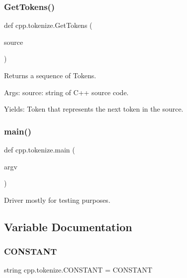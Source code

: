 \subsubsection{\texorpdfstring{Get\+Tokens()}{GetTokens()}}
{\footnotesize\ttfamily def cpp.\+tokenize.\+Get\+Tokens (\begin{DoxyParamCaption}\item[{}]{source }\end{DoxyParamCaption})}

\begin{DoxyVerb}Returns a sequence of Tokens.

Args:
  source: string of C++ source code.

Yields:
  Token that represents the next token in the source.
\end{DoxyVerb}
 \mbox{\label{namespacecpp_1_1tokenize_ae666c331b4bd7d1f3e8956c78cc6f3a4}} 
\subsubsection{\texorpdfstring{main()}{main()}}
{\footnotesize\ttfamily def cpp.\+tokenize.\+main (\begin{DoxyParamCaption}\item[{}]{argv }\end{DoxyParamCaption})}

\begin{DoxyVerb}Driver mostly for testing purposes.\end{DoxyVerb}
 

\subsection{Variable Documentation}
\mbox{\label{namespacecpp_1_1tokenize_a5e3bf1014a301906871113a989188a78}} 
\subsubsection{\texorpdfstring{C\+O\+N\+S\+T\+A\+NT}{CONSTANT}}
{\footnotesize\ttfamily string cpp.\+tokenize.\+C\+O\+N\+S\+T\+A\+NT = \textquotesingle{}C\+O\+N\+S\+T\+A\+NT\textquotesingle{}}

